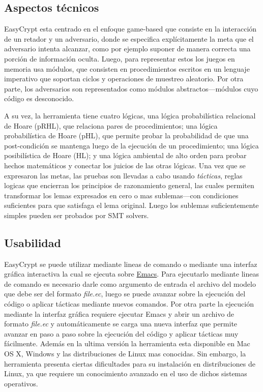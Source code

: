 \documentclass[runningheads]{llncs}
\begin{document}
\subsection{Aspectos técnicos}

EasyCrypt esta centrado en el enfoque game-based que consiste en la interacción de un retador y un adversario, donde se especifica explícitamente la meta que el adversario intenta alcanzar, como por ejemplo suponer de manera correcta una porción de información oculta. Luego, para representar estos los juegos en memoria usa módulos, que consisten en procedimientos escritos en un lenguaje imperativo que soportan ciclos y operaciones de muestreo aleatorio. Por otra parte, los adversarios son representados como módulos abstractos—módulos cuyo código es desconocido.

A su vez, la herramienta tiene cuatro lógicas, una lógica probabilística relacional de Hoare (pRHL), que relaciona pares de procedimientos; una lógica probabilística de Hoare (pHL), que permite probar la probabilidad de que una post-condición se mantenga luego de la ejecución de un procedimiento; una lógica posibilística de Hoare (HL); y una lógica ambiental de alto orden para probar hechos matemáticos y conectar los juicios de las otras lógicas. Una vez que se expresaron las metas, las pruebas son llevadas a cabo usando \textit{tácticas}, reglas logicas que encierran los principios de razonamiento general, las cuales permiten transformar los lemas expresados en cero o mas sublemas—con condiciones suficientes para que satisfaga el lema original. Luego los sublemas suficientemente simples pueden ser probados por SMT solvers.

\subsection{Usabilidad}
EasyCrypt se puede utilizar mediante lineas de comando o mediante una interfaz gráfica interactiva la cual se ejecuta sobre \href{https://www.gnu.org/software/emacs/}{Emacs}. Para ejecutarlo mediante lineas de comando es necesario darle como argumento de entrada el archivo del modelo que debe ser del formato \textit{file.ec}, luego se puede avanzar sobre la ejecución del código o aplicar tácticas mediante nuevos comandos. Por otra parte la ejecución mediante la interfaz gráfica requiere ejecutar Emacs y abrir un archivo de formato \textit{file.ec} y automáticamente se carga una nueva interfaz que permite avanzar en paso a paso sobre la ejecución del código y aplicar tácticas muy fácilmente. Además en la ultima versión la herramienta esta disponible en Mac OS X, Windows y las distribuciones de Linux mas conocidas. Sin embargo, la herramienta presenta ciertas dificultades para su instalación en distribuciones de Linux, ya que requiere un conocimiento avanzado en el uso de dichos sistemas operativos.
\end{document}
